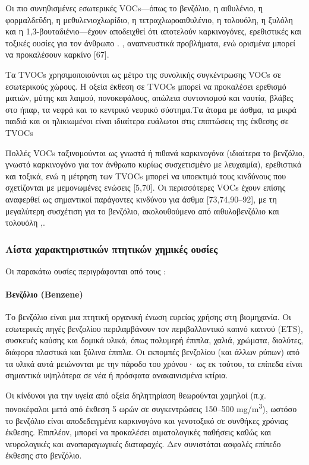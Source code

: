 Οι πιο συνηθισμένες εσωτερικές VOCs—όπως το βενζόλιο, η αιθυλένιο, η φορμαλδεΰδη, η μεθυλενιοχλωρίδιο, η τετραχλωροαιθυλένιο, η τολουόλη, η ξυλόλη και η 1,3-βουταδιένιο—έχουν αποδειχθεί ότι αποτελούν καρκινογόνες, ερεθιστικές και τοξικές ουσίες για τον άνθρωπο . , αναπνευστικά προβλήματα, ενώ ορισμένα μπορεί να προκαλέσουν καρκίνο [67].  

Τα TVOCs χρησιμοποιούνται ως μέτρο της συνολικής συγκέντρωσης VOCs σε εσωτερικούς χώρους. Η οξεία έκθεση σε TVOCs μπορεί να προκαλέσει ερεθισμό ματιών, μύτης και λαιμού, πονοκεφάλους, απώλεια συντονισμού και ναυτία, βλάβες στο ήπαρ, τα νεφρά και το κεντρικό νευρικό σύστημα.Τα άτομα με άσθμα, τα μικρά παιδιά και οι ηλικιωμένοι είναι ιδιαίτερα ευάλωτοι στις επιπτώσεις της έκθεσης σε TVOCs

Πολλές VOCs ταξινομούνται ως γνωστά ή πιθανά καρκινογόνα (ιδιαίτερα το βενζόλιο, γνωστό καρκινογόνο για τον άνθρωπο κυρίως συσχετισμένο με λευχαιμία), ερεθιστικά και τοξικά, ενώ η μέτρηση των TVOCs μπορεί να υποεκτιμά τους κινδύνους που σχετίζονται με μεμονωμένες ενώσεις [5,70]. Οι περισσότερες VOCs έχουν επίσης αναφερθεί ως σημαντικοί παράγοντες κινδύνου για άσθμα [73,74,90–92], με τη μεγαλύτερη συσχέτιση για το βενζόλιο, ακολουθούμενο από αιθυλοβενζόλιο και τολουόλη \cite{ijerph17238972},\cite{su12219045}.


\subsubsection{Λίστα χαρακτηριστικών πτητικών χημικές ουσίες}

Οι παρακάτω ουσίες περιγράφονται από τους \cite{GONZALEZMARTIN2021128376}:

\paragraph{Βενζόλιο (Benzene)}

Το βενζόλιο είναι μια πτητική οργανική ένωση ευρείας χρήσης στη βιομηχανία. Οι εσωτερικές πηγές βενζολίου περιλαμβάνουν τον περιβαλλοντικό καπνό καπνού (ETS), συσκευές καύσης και δομικά υλικά, όπως πολυμερή έπιπλα, χαλιά, χρώματα, διαλύτες, διάφορα πλαστικά και ξύλινα έπιπλα. Οι εκπομπές βενζολίου (και άλλων ρύπων) από τα υλικά αυτά μειώνονται με την πάροδο του χρόνου· ως εκ τούτου, τα επίπεδα είναι σημαντικά υψηλότερα σε νέα ή πρόσφατα ανακαινισμένα κτίρια.

Οι κίνδυνοι για την υγεία από οξεία δηλητηρίαση θεωρούνται χαμηλοί (π.χ. πονοκέφαλοι μετά από έκθεση 5 ωρών σε συγκεντρώσεις 150–500 mg/m\textsuperscript{3}), ωστόσο το βενζόλιο είναι αποδεδειγμένα καρκινογόνο και γενοτοξικό σε συνθήκες χρόνιας έκθεσης. Επιπλέον, μπορεί να προκαλέσει αιματολογικές παθήσεις καθώς και νευρολογικές και αναπαραγωγικές διαταραχές. Δεν συνιστάται ασφαλές επίπεδο έκθεσης στο βενζόλιο.

